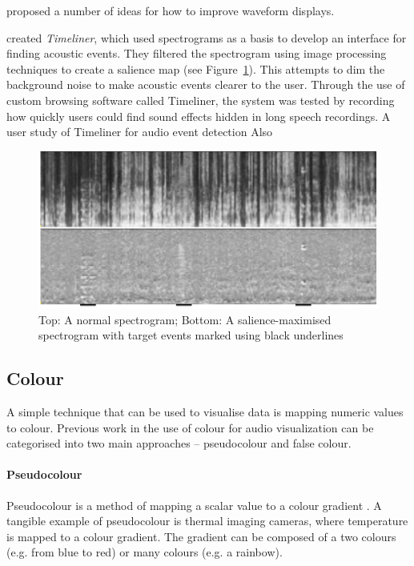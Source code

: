\citet{Gohlke2010} proposed a number of ideas for how to improve waveform displays.


\citet{Goudeseune2012} created \textit{Timeliner}, which used spectrograms as a basis to develop an interface for
finding acoustic events.  They filtered the spectrogram using image processing techniques to create a salience map (see
Figure~\ref{fig:timeliner}). This attempts to dim the background noise to make acoustic events clearer to the user.
Through the use of custom browsing software called Timeliner, the system was tested by recording how quickly users
could find sound effects hidden in long speech recordings.
A user study of Timeliner for audio event detection \citep{Hasegawa-Johnson2011}
Also \citep{Lin2012,Lin2013}

\begin{figure}[ht]
  \centering
  \includegraphics[width=0.95\linewidth]{figs/spectrogram-salience.png}
  \caption{Top: A normal spectrogram; Bottom: A salience-maximised spectrogram with target events marked using black
    underlines}
  \label{fig:timeliner}
\end{figure}

\subsection{Colour}\label{sec:background-colour} A simple technique that can be used to visualise data is mapping
numeric values to colour.  Previous work in the use of colour for audio visualization can be categorised into two main
approaches -- pseudocolour and false colour.

\paragraph{Pseudocolour}\label{sec:background-pseudocolour} Pseudocolour is a method of mapping a scalar value to a
colour gradient \citep{Moreland2009}.  A tangible example of pseudocolour is thermal imaging cameras, where temperature
is mapped to a colour gradient.  The gradient can be composed of a two colours (e.g. from blue to red) or many colours
(e.g. a rainbow).

